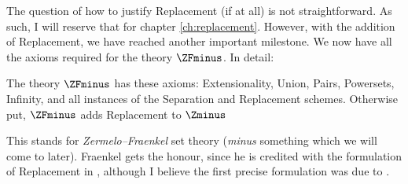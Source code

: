 \documentclass[../../../include/open-logic-section]{subfiles}
\begin{document}
The question of how to justify Replacement (if at all) is not straightforward. As such, I will reserve that for chapter \ref{ch:replacement}. However, with the addition of Replacement, we have reached another important milestone. We now have all the axioms required for the theory $\ZFminus$. In detail:
\begin{defn}
	The theory $\ZFminus$ has these axioms: Extensionality, Union, Pairs, Powersets, Infinity, and all instances of the Separation and Replacement schemes. Otherwise put, $\ZFminus$ adds Replacement to $\Zminus$
\end{defn}\noindent
This stands for \emph{Zermelo--Fraenkel} set theory (\emph{minus} something which we will come to later). Fraenkel gets the honour, since he is credited with the formulation of Replacement in \citeyear{Fraenkel1922}, although I believe the first precise formulation was due to \citet{Skolem1922}.
\end{document}

